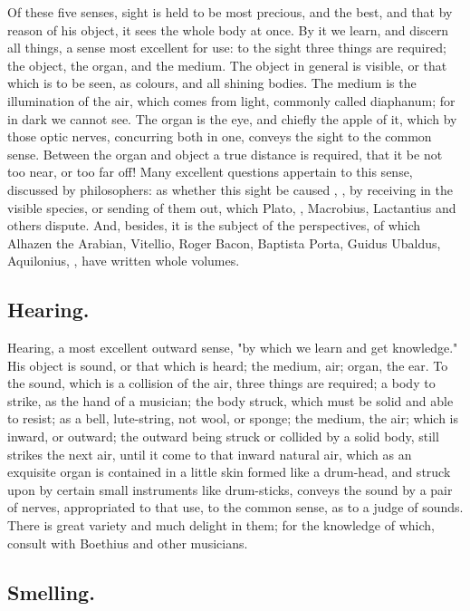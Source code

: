 Of these five senses, sight is held to be most precious, and the best, and that
by reason of his object, it sees the whole body at once. By it we learn, and
discern all things, a sense most excellent for use: to the sight three things
are required; the object, the organ, and the medium. The object in general is
visible, or that which is to be seen, as colours, and all shining bodies. The
medium is the illumination of the air, which comes from
light, commonly called diaphanum; for in dark we cannot
see. The organ is the eye, and chiefly the apple of it, which by those optic
nerves, concurring both in one, conveys the sight to the common sense. Between
the organ and object a true distance is required, that it be not too near, or
too far off! Many excellent questions appertain to this sense, discussed by
philosophers: as whether this sight be caused , \etc{}, by receiving in the visible species, or sending of them out,
which Plato, \Plutarch{},
Macrobius, Lactantius and others
dispute. And, besides, it is the subject of the perspectives, of which Alhazen
the Arabian, Vitellio, Roger Bacon, Baptista Porta, Guidus Ubaldus, Aquilonius,
\etc{}, have written whole volumes.

\subsection{Hearing.}

Hearing, a most excellent outward sense, "by which we learn and get knowledge."
His object is sound, or that which is heard; the medium, air; organ, the ear.
To the sound, which is a collision of the air, three things are required; a
body to strike, as the hand of a musician; the body struck, which must be solid
and able to resist; as a bell, lute-string, not wool, or sponge; the medium,
the air; which is inward, or outward; the outward being struck or collided by a
solid body, still strikes the next air, until it come to that inward natural
air, which as an exquisite organ is contained in a little skin formed like a
drum-head, and struck upon by certain small instruments like drum-sticks,
conveys the sound by a pair of nerves, appropriated to that use, to the common
sense, as to a judge of sounds. There is great variety and much delight in
them; for the knowledge of which, consult with Boethius and other musicians.

\subsection{Smelling.}

